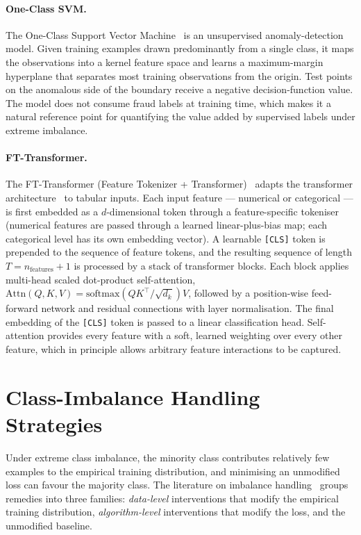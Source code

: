 \paragraph{One-Class SVM.}
The One-Class Support Vector Machine~\cite{scholkopf2001estimating} is an unsupervised anomaly-detection
model. Given training examples drawn predominantly from a single class, it
maps the observations into a kernel feature space and learns a maximum-margin
hyperplane that separates most training observations from the origin. Test
points on the anomalous side of the boundary receive a negative
decision-function value. The model does not consume fraud labels at training time, which
makes it a natural reference point for quantifying the value added by
supervised labels under extreme imbalance.

\paragraph{FT-Transformer.}
The FT-Transformer (Feature Tokenizer + Transformer)~\cite{gorishniy2021revisiting}
adapts the transformer architecture~\cite{vaswani2017attention} to tabular
inputs. Each input feature --- numerical or categorical --- is first
embedded as a $d$-dimensional token through a feature-specific tokeniser
(numerical features are passed through a learned linear-plus-bias map; each
categorical level has its own embedding vector). A learnable \texttt{[CLS]}
token is prepended to the sequence of feature tokens, and the resulting
sequence of length $T{=}n_{\text{features}}{+}1$ is processed by a stack of
transformer blocks. Each block applies multi-head scaled dot-product
self-attention,
$\mathrm{Attn}(Q,K,V)=\mathrm{softmax}(QK^{\top}/\!\sqrt{d_k})V$, followed by
a position-wise feed-forward network and residual connections with layer
normalisation. The final embedding of the \texttt{[CLS]} token is passed to a
linear classification head. Self-attention provides every feature with a
soft, learned weighting over every other feature, which in principle allows
arbitrary feature interactions to be captured.

\section{Class-Imbalance Handling Strategies}
\label{sec:tb:imbalance}

Under extreme class imbalance, the minority class contributes relatively few
examples to the empirical training distribution, and minimising an unmodified
loss can favour the majority class. The
literature on imbalance handling~\cite{hegarcia2009learning, krawczyk2016learning}
groups remedies into three families: \emph{data-level} interventions that
modify the empirical training distribution, \emph{algorithm-level}
interventions that modify the loss, and the unmodified baseline.

